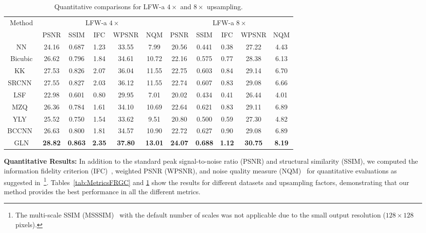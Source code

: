 \documentclass[runningheads]{llncs}
\begin{document}
\begin{table}[t]
\centering
\small
\caption{Quantitative comparisons for LFW-a $4\times$ and $8\times$ upsampling.}
\vspace{-4mm}
\label{tab:MetricsLFWA}
\begin{tabular}[t]{|c||c|c|c|c|c||c|c|c|c|c|}
\hline
Method & \multicolumn{5}{|c||}{LFW-a $4\times$} & \multicolumn{5}{|c|}{LFW-a $8\times$}\\
\cline{2-11}
 & PSNR & SSIM & IFC & WPSNR & NQM & PSNR & SSIM & IFC & WPSNR & NQM \\
\hline

NN                        & 24.16 & 0.687 & 1.23 & 33.55 & 7.99 & 20.56 & 0.441 & 0.38 & 27.22 & 4.43\\
\hline
Bicubic                   & 26.62 & 0.796 & 1.84 & 34.61 & 10.72 & 22.16 & 0.575 & 0.77 & 28.38 & 6.13\\
\hline
KK~\cite{Kim10PAMI}       & 27.53 & 0.826 & 2.07 & 36.04 & 11.55 & 22.75 & 0.603 & 0.84 & 29.14 & 6.70\\
\hline
SRCNN~\cite{Dong15PAMI}   & 27.55 & 0.827 & 2.03 & 36.12 & 11.55 & 22.74 & 0.607 & 0.83 & 29.08 & 6.66\\
\hline
LSF~\cite{Liu07}           & 22.98 & 0.601 & 0.80 & 29.95 & 7.01 & 20.02 & 0.434 & 0.41 & 26.44 & 4.01\\
\hline
MZQ~\cite{Ma10PR}         & 26.36 & 0.784 & 1.61 & 34.10 & 10.69 & 22.64 & 0.621 & 0.83 & 29.11 & 6.89\\
\hline
YLY~\cite{Yang13CVPR}     & 25.52 & 0.750 & 1.54 & 33.62 & 9.51 & 20.80 & 0.500 & 0.59 & 27.30 & 4.82\\
\hline
BCCNN~\cite{Zhou15AAAI}   & 26.63 & 0.800 & 1.81 & 34.57 & 10.90 & 22.72 & 0.627 & 0.90 & 29.08 & 6.89\\
\hline
GLN                       & \bf 28.82 & \bf 0.863 & \bf 2.35 & \bf 37.80 & \bf 13.01 & \bf 24.07 & \bf 0.688 & \bf 1.12 & \bf 30.75 & \bf 8.19\\
\hline


\end{tabular}
\end{table}


{\bf Quantitative Results:}
In addition to the standard peak signal-to-noise ratio (PSNR) and structural similarity (SSIM), we computed the information fidelity criterion (IFC)~\cite{Sheikh05IFC}, weighted PSNR (WPSNR), and noise quality measure (NQM)~\cite{Damera00NQM} for quantitative evaluations as suggested in~\cite{Yang14ECCV}\footnote{The multi-scale SSIM (MSSSIM)~\cite{Wang03MSSSIM} with the default number of scales was not applicable due to the small output resolution ($128\times128$ pixels).}.
Tables~\ref{tab:MetricsFRGC} and \ref{tab:MetricsLFWA} show the results for different datasets and upsampling factors, demonstrating that our method provides the best performance in all the different metrics.
\end{document}
